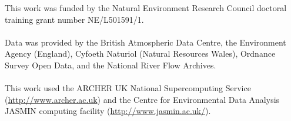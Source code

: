 \afterabstract
%
%
%
\noindent
This work was funded by the Natural Environment Research Council doctoral training grant number NE/L501591/1.
\\~\\
\noindent
Data was provided by the British Atmospheric Data Centre, the Environment Agency (England), Cyfoeth Naturiol (Natural Resources Wales), Ordnance Survey Open Data, and the National River Flow Archives. 
\\~\\
\noindent
This work used the ARCHER UK National Supercomputing Service (\url{http://www.archer.ac.uk}) and the Centre for Environmental Data Analysis JASMIN computing facility (\url{http://www.jasmin.ac.uk/}).
\afterpreface
